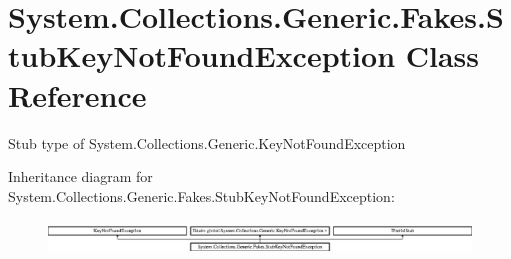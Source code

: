 \hypertarget{class_system_1_1_collections_1_1_generic_1_1_fakes_1_1_stub_key_not_found_exception}{\section{System.\-Collections.\-Generic.\-Fakes.\-Stub\-Key\-Not\-Found\-Exception Class Reference}
\label{class_system_1_1_collections_1_1_generic_1_1_fakes_1_1_stub_key_not_found_exception}
}


Stub type of System.\-Collections.\-Generic.\-Key\-Not\-Found\-Exception 


Inheritance diagram for System.\-Collections.\-Generic.\-Fakes.\-Stub\-Key\-Not\-Found\-Exception\-:\begin{figure}[H]
\begin{center}
\leavevmode
\includegraphics[height=0.931006cm]{class_system_1_1_collections_1_1_generic_1_1_fakes_1_1_stub_key_not_found_exception}
\end{center}
\end{figure}

